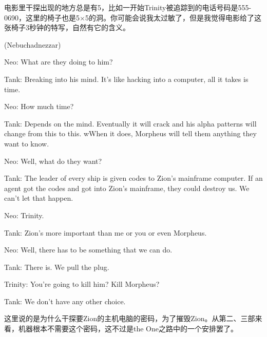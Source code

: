 \documentclass[UTF8]{ctexart}
\newenvironment{myquote}{\color{green} \setlength{\leftskip}{6em} \setlength{\rightskip}{4em} \setlength{\parindent}{-2em}}{\par}
\begin{document}
电影里干探出现的地方总是有5，比如一开始Trinity被追踪到的电话号码是555-0690，这里的椅子也是5$\times$5的洞。你可能会说我太过敏了，但是我觉得电影给了这张椅子3秒钟的特写，自然有它的含义。

\begin{myquote}
(Nebuchadnezzar)

Neo: What are they doing to him?

Tank: Breaking into his mind. It's like hacking into a computer, all it takes is time.

Neo: How much time?

Tank: Depends on the mind. Eventually it will crack and his alpha patterns will change from this to this. wWhen it does, Morpheus will tell them anything they want to know.

Neo: Well, what do they want?

Tank: The leader of every ship is given codes to Zion's mainframe computer. If an agent got the codes and got into Zion's mainframe, they could destroy us. We can't let that happen.

Neo: Trinity.

Tank: Zion's more important than me or you or even Morpheus.

Neo: Well, there has to be something that we can do.

Tank: There is. We pull the plug.

Trinity: You're going to kill him? Kill Morpheus?

Tank: We don't have any other choice.
\end{myquote}

这里说的是为什么干探要Zion的主机电脑的密码，为了摧毁Zion。从第二、三部来看，机器根本不需要这个密码，这不过是the One之路中的一个安排罢了。
\end{document}
